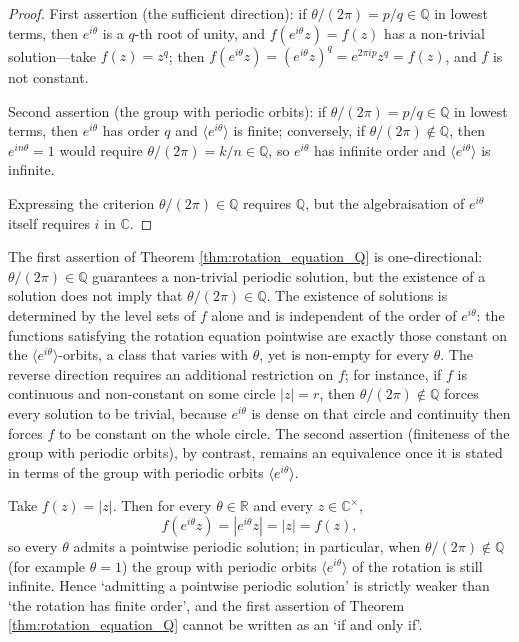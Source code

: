 \begin{proof}
First assertion (the sufficient direction): if $\theta/(2\pi)=p/q\in\mathbb{Q}$ in lowest terms, then $e^{i\theta}$ is a $q$-th root of unity, and $f(e^{i\theta}z)=f(z)$ has a non-trivial solution---take $f(z)=z^{q}$; then $f(e^{i\theta}z)=(e^{i\theta}z)^{q}=e^{2\pi ip}z^{q}=f(z)$, and $f$ is not constant.

Second assertion (the group with periodic orbits): if $\theta/(2\pi)=p/q\in\mathbb{Q}$ in lowest terms, then $e^{i\theta}$ has order $q$ and $\langle e^{i\theta}\rangle$ is finite; conversely, if $\theta/(2\pi)\notin\mathbb{Q}$, then $e^{in\theta}=1$ would require $\theta/(2\pi)=k/n\in\mathbb{Q}$, so $e^{i\theta}$ has infinite order and $\langle e^{i\theta}\rangle$ is infinite.

Expressing the criterion $\theta/(2\pi)\in\mathbb{Q}$ requires $\mathbb{Q}$, but the algebraisation of $e^{i\theta}$ itself requires $i$ in $\mathbb{C}$.
\end{proof}

\begin{remark}\label{rem:rotation_equation_Q_converse}
The first assertion of Theorem \ref{thm:rotation_equation_Q} is one-directional: $\theta/(2\pi)\in\mathbb{Q}$ guarantees a non-trivial periodic solution, but the existence of a solution does not imply that $\theta/(2\pi)\in\mathbb{Q}$. The existence of solutions is determined by the level sets of $f$ alone and is independent of the order of $e^{i\theta}$: the functions satisfying the rotation equation pointwise are exactly those constant on the $\langle e^{i\theta}\rangle$-orbits, a class that varies with $\theta$, yet is non-empty for every $\theta$. The reverse direction requires an additional restriction on $f$; for instance, if $f$ is continuous and non-constant on some circle $|z|=r$, then $\theta/(2\pi)\notin\mathbb{Q}$ forces every solution to be trivial, because $e^{i\theta}$ is dense on that circle and continuity then forces $f$ to be constant on the whole circle. The second assertion (finiteness of the group with periodic orbits), by contrast, remains an equivalence once it is stated in terms of the group with periodic orbits $\langle e^{i\theta}\rangle$.
\end{remark}

\begin{example}\label{ex:rotation_equation_module}
Take $f(z)=|z|$. Then for every $\theta\in\mathbb{R}$ and every $z\in\mathbb{C}^\times$,
\[
f(e^{i\theta}z)=|e^{i\theta}z|=|z|=f(z),
\]
so every $\theta$ admits a pointwise periodic solution; in particular, when $\theta/(2\pi)\notin\mathbb{Q}$ (for example $\theta=1$) the group with periodic orbits $\langle e^{i\theta}\rangle$ of the rotation is still infinite. Hence `admitting a pointwise periodic solution' is strictly weaker than `the rotation has finite order', and the first assertion of Theorem \ref{thm:rotation_equation_Q} cannot be written as an `if and only if'.
\end{example}

